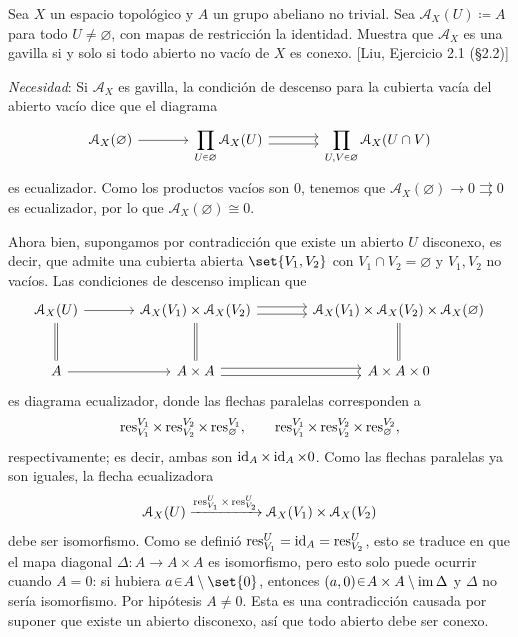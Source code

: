 \begin{ejer}\label{ejer:t3-pregavilla-constante}
Sea $X$ un espacio topológico y $A$ un grupo abeliano no trivial. Sea $\mathcal A_X(U)\coloneq A$ para todo $U\ne\varnothing$, con mapas de restricción la identidad. Muestra que $\mathcal A_X$ es una gavilla si y solo si todo abierto no vacío de $X$ es conexo. \hfill [Liu, Ejercicio 2.1 (§2.2)]
\end{ejer}
\begin{sol}
\noindent\emph{Necesidad}: Si $\mathcal A_X$ es gavilla, la condición de descenso para la cubierta vacía del abierto vacío dice que el diagrama
\[
\begin{tikzcd}[column sep=large]
\mathcal A_X(\varnothing)\arrow[r]
&\displaystyle\prod_{U\en\varnothing}\mathcal A_X(U)
\arrow[r,shift left=.6ex]\arrow[r,shift right=.6ex]
&\displaystyle\prod_{U,V\en\varnothing}\mathcal A_X(U\cap V)
\end{tikzcd}
\]
es ecualizador. Como los productos vacíos son $0$, tenemos que $\mathcal A_X(\varnothing)\to0\rightrightarrows0$ es ecualizador, por lo que $\mathcal A_X(\varnothing)\cong0$.

Ahora bien, supongamos por contradicción que existe un abierto $U$ disconexo, es decir, que admite una cubierta abierta $\set{V_1,V_2}$ con $V_1\cap V_2=\varnothing$ y $V_1,V_2$ no vacíos. Las condiciones de descenso implican que
\[
\begin{tikzcd}[column sep=large,row sep=large]
\mathcal A_X(U)\arrow[r]\arrow[d,equal]
&\mathcal A_X(V_1)\times\mathcal A_X(V_2)
\arrow[r,shift left=.6ex]\arrow[r,shift right=.6ex]\arrow[d,equal]
&\mathcal A_X(V_1)\times\mathcal A_X(V_2)\times\mathcal A_X(\varnothing)\arrow[d,equal]\\
A\arrow[r]&A\times A
\arrow[r,shift left=.6ex]\arrow[r,shift right=.6ex]&A\times A\times0
\end{tikzcd}
\]
es diagrama ecualizador, donde las flechas paralelas corresponden a
\[
\operatorname{res}_{V_1}^{V_1}\times\operatorname{res}_{V_2}^{V_2}\times\operatorname{res}_{\varnothing}^{V_1},
\qquad
\operatorname{res}_{V_1}^{V_1}\times\operatorname{res}_{V_2}^{V_2}\times\operatorname{res}_{\varnothing}^{V_2},
\]
respectivamente; es decir, ambas son $\operatorname{id}_A\times\operatorname{id}_A\times0$. Como las flechas paralelas ya son iguales, la flecha ecualizadora
\[
\mathcal A_X(U)\xrightarrow{\operatorname{res}_{V_1}^U\times\operatorname{res}_{V_2}^U}
\mathcal A_X(V_1)\times\mathcal A_X(V_2)
\]
debe ser isomorfismo. Como se definió $\operatorname{res}_{V_1}^U=\operatorname{id}_A=\operatorname{res}_{V_2}^U$, esto se traduce en que el mapa diagonal $\Delta\colon A\to A\times A$ es isomorfismo, pero esto solo puede ocurrir cuando $A=0$: si hubiera $a\en A\setminus\set{0}$, entonces $(a,0)\en A\times A\setminus\im\Delta$ y $\Delta$ no sería isomorfismo. Por hipótesis $A\ne0$. Esta es una contradicción causada por suponer que existe un abierto disconexo, así que todo abierto debe ser conexo.


\end{sol}
